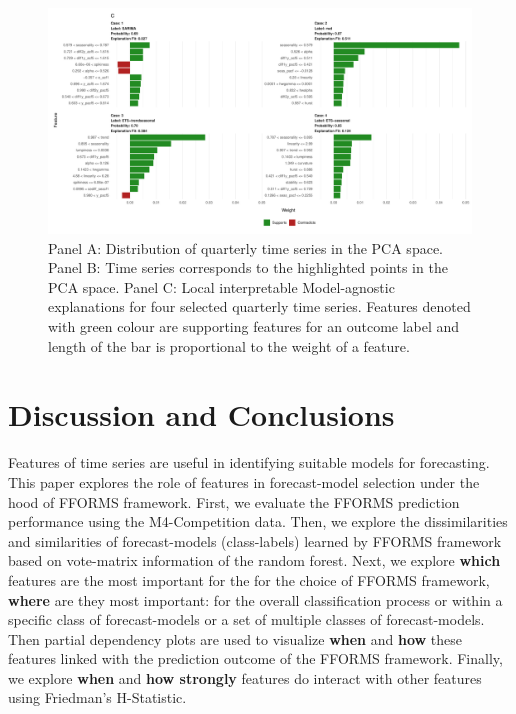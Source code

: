 \documentclass[11pt,a4paper,]{article}
\begin{document}
\begin{figure}[h]

{\centering \includegraphics{figures/quarterlylime2-1} 

}

\caption{Panel A: Distribution of quarterly time series in the PCA space. Panel B: Time series corresponds to the highlighted points in the PCA space. Panel C: Local interpretable Model-agnostic explanations for four selected quarterly time series. Features denoted with green colour are supporting features for an outcome label and length of the bar is proportional to the weight of a feature.}\label{fig:quarterlylime2}
\end{figure}

\hypertarget{conclusions}{%
\section{Discussion and Conclusions}\label{conclusions}}

Features of time series are useful in identifying suitable models for forecasting. This paper explores the role of features in forecast-model selection under the hood of FFORMS framework. First, we evaluate the FFORMS prediction performance using the M4-Competition data. Then, we explore the dissimilarities and similarities of forecast-models (class-labels) learned by FFORMS framework based on vote-matrix information of the random forest. Next, we explore \textbf{which} features are the most important for the for the choice of FFORMS framework, \textbf{where} are they most important: for the overall classification process or within a specific class of forecast-models or a set of multiple classes of forecast-models. Then partial dependency plots are used to visualize \textbf{when} and \textbf{how} these features linked with the prediction outcome of the FFORMS framework. Finally, we explore \textbf{when} and \textbf{how strongly} features do interact with other features using Friedman's H-Statistic.
\end{document}
